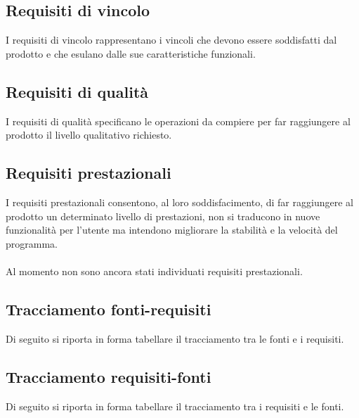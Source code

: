 \documentclass[a4paper]{article}
\begin{document}
	\subsection{Requisiti di vincolo}
	I requisiti di vincolo rappresentano i vincoli che devono essere soddisfatti dal prodotto e che esulano dalle
	sue caratteristiche funzionali.
	\subsection{Requisiti di qualità}
	I requisiti di qualità specificano le operazioni da compiere per far raggiungere al prodotto il livello 
	qualitativo richiesto. 
	\subsection{Requisiti prestazionali}
	I requisiti prestazionali consentono, al loro soddisfacimento, di far raggiungere al prodotto un determinato
	livello di prestazioni, non si traducono in nuove funzionalità per l'utente ma intendono migliorare 
	la stabilità e la velocità del programma.\\ \\
	Al momento non sono ancora stati individuati requisiti prestazionali.
	
	\subsection{Tracciamento fonti-requisiti}
	Di seguito si riporta in forma tabellare il tracciamento tra le fonti e i requisiti.
	
	\subsection{Tracciamento requisiti-fonti}
	Di seguito si riporta in forma tabellare il tracciamento tra i requisiti e le fonti.
	
\end{document}
